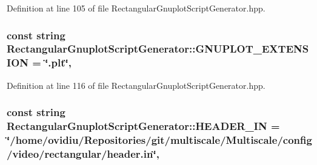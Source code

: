 Definition at line 105 of file Rectangular\-Gnuplot\-Script\-Generator.\-hpp.

\hypertarget{classmultiscale_1_1video_1_1RectangularGnuplotScriptGenerator_afa1626f7904b3006ac768f770c799283}{
\subsubsection[{G\-N\-U\-P\-L\-O\-T\-\_\-\-E\-X\-T\-E\-N\-S\-I\-O\-N}]{\setlength{\rightskip}{0pt plus 5cm}const string Rectangular\-Gnuplot\-Script\-Generator\-::\-G\-N\-U\-P\-L\-O\-T\-\_\-\-E\-X\-T\-E\-N\-S\-I\-O\-N = \char`\"{}.plt\char`\"{}\hspace{0.3cm}{\ttfamily [static]}, {\ttfamily [private]}}}\label{classmultiscale_1_1video_1_1RectangularGnuplotScriptGenerator_afa1626f7904b3006ac768f770c799283}


Definition at line 116 of file Rectangular\-Gnuplot\-Script\-Generator.\-hpp.

\hypertarget{classmultiscale_1_1video_1_1RectangularGnuplotScriptGenerator_afeced106138e618bb292826093205023}{
\subsubsection[{H\-E\-A\-D\-E\-R\-\_\-\-I\-N}]{\setlength{\rightskip}{0pt plus 5cm}const string Rectangular\-Gnuplot\-Script\-Generator\-::\-H\-E\-A\-D\-E\-R\-\_\-\-I\-N = \char`\"{}/home/ovidiu/Repositories/git/multiscale/Multiscale/config/video/rectangular/header.\-in\char`\"{}\hspace{0.3cm}{\ttfamily [static]}, {\ttfamily [private]}}}\label{classmultiscale_1_1video_1_1RectangularGnuplotScriptGenerator_afeced106138e618bb292826093205023}


